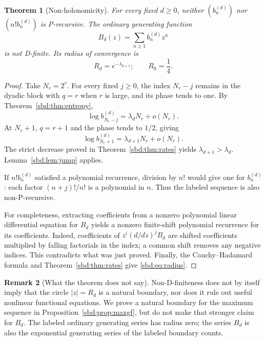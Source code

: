 \documentclass[11pt,a4paper]{article}
\newtheorem{theorem}{Theorem}[section]
\theoremstyle{definition}
\newtheorem{remark}[theorem]{Remark}
\begin{document}
\begin{theorem}[Non-holonomicity]\label{sbd:thm:nonholonomic}
For every fixed $d\ge0$, neither $(b_n^{(d)})$ nor $(n!b_n^{(d)})$ is
P-recursive. The ordinary generating function
\begin{equation}\label{sbd:eq:Bgf}
 B_d(z)=\sum_{n\ge1}b_n^{(d)}z^n
\end{equation}
is not D-finite. Its radius of convergence is
\begin{equation}\label{sbd:eq:radius}
 R_d=e^{-\lambda_{d+1}};
 \qquad R_0=\frac14.
\end{equation}
\end{theorem}
\begin{proof}
Take $N_r=2^r$. For every fixed $j\ge0$, the index $N_r-j$ remains in
the dyadic block with $q=r$ when $r$ is large, and its phase tends to
one. By Theorem~\ref{sbd:thm:entropy},
\[
 \log b_{N_r-j}^{(d)}=\lambda_d N_r+o(N_r).
\]
At $N_r+1$, $q=r+1$ and the phase tends to $1/2$, giving
\[
 \log b_{N_r+1}^{(d)}=\lambda_{d+1}N_r+o(N_r).
\]
The strict decrease proved in Theorem~\ref{sbd:thm:rates} yields
$\lambda_{d+1}>\lambda_d$. Lemma~\ref{sbd:lem:jump} applies.

If $n!b_n^{(d)}$ satisfied a polynomial recurrence, division by $n!$
would give one for $b_n^{(d)}$: each factor $(n+j)!/n!$ is a polynomial
in $n$. Thus the labeled sequence is also non-P-recursive.

For completeness, extracting coefficients from a nonzero polynomial
linear differential equation for $B_d$ yields a nonzero finite-shift
polynomial recurrence for its coefficients. Indeed, coefficients of
$z^i(d/dz)^jB_d$ are shifted coefficients multiplied by falling
factorials in the index; a common shift removes any negative indices.
This contradicts what was just proved. Finally, the Cauchy--Hadamard
formula and Theorem~\ref{sbd:thm:rates} give \eqref{sbd:eq:radius}.
\end{proof}

\begin{remark}[What the theorem does not say]
Non-D-finiteness does not by itself imply that the circle $|z|=R_d$ is a
natural boundary, nor does it rule out useful nonlinear functional
equations. We prove a natural boundary for the maximum sequence in
Proposition~\ref{sbd:prop:maxgf}, but do not make that stronger claim for
$B_d$. The labeled ordinary generating series has radius zero; the
series $B_d$ is also the exponential generating series of the labeled
boundary counts.
\end{remark}
\end{document}
